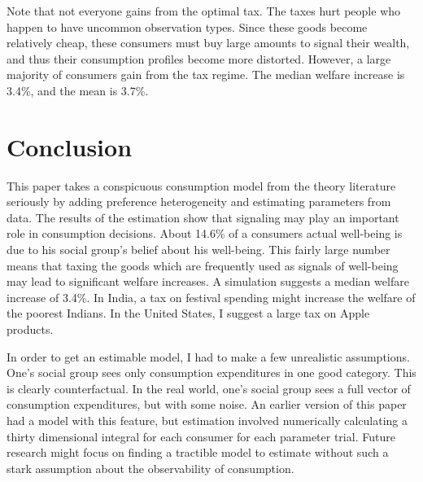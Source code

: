 \documentclass{article}
\begin{document}
Note that not everyone gains from the optimal tax.  
The taxes hurt people who happen to have uncommon observation types.
Since these goods become relatively cheap, these consumers must buy large amounts to signal their wealth, and thus their consumption profiles become more distorted.
However, a large majority of consumers gain from the tax regime.
The median welfare increase is 3.4\%, and the mean is 3.7\%.
\section{Conclusion}
This paper takes a conspicuous consumption model from the theory literature seriously by adding preference heterogeneity and estimating parameters from data.
The results of the estimation show that signaling may play an important role in consumption decisions.
About 14.6\% of a consumers actual well-being is due to his social group's belief about his well-being.
This fairly large number means that taxing the goods which are frequently used as signals of well-being may lead to significant welfare increases.
A simulation suggests a median welfare increase of 3.4\%.
In India, a tax on festival spending might increase the welfare of the poorest Indians.
In the United States, I suggest a large tax on Apple products.

In order to get an estimable model, I had to make a few unrealistic assumptions.
One's social group sees only consumption expenditures in one good category. 
This is clearly counterfactual.
In the real world, one's social group sees a full vector of consumption expenditures, but with some noise.
An earlier version of this paper had a model with this feature, but estimation involved numerically calculating a thirty dimensional integral for each consumer for each parameter trial.
Future research might focus on finding a tractible model to estimate without such a stark assumption about the observability of consumption.


\end{document}
